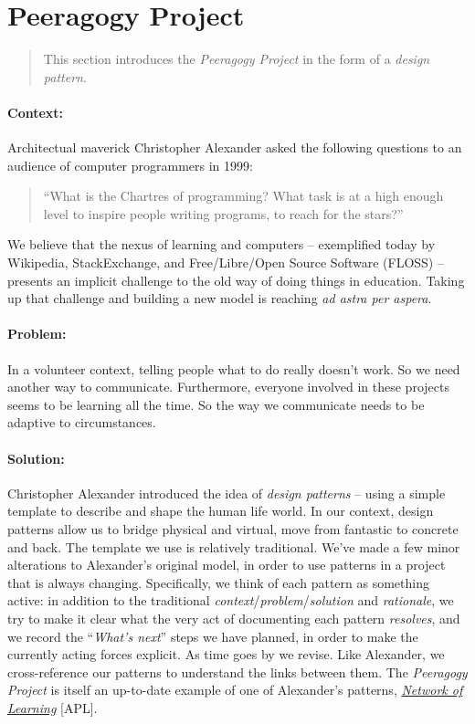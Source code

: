 \section{Peeragogy Project}

\begin{quote}
This section introduces the \emph{Peeragogy Project} in the form of a \emph{design pattern}.
\end{quote}

\paragraph{Context:}  Architectual maverick Christopher Alexander asked the following questions to an audience of computer programmers in 1999: 
\begin{quote}
``What is the Chartres of programming? What task is at a high enough level to inspire people writing programs, to reach for the stars?''
\end{quote}
We believe that the nexus of learning and computers -- exemplified today by Wikipedia, StackExchange, and Free/Libre/Open Source Software (FLOSS) -- presents an implicit challenge to the old way of doing things in education.  Taking up that challenge and building a new model is reaching \emph{ad astra per aspera}.  

\paragraph{Problem:} In a volunteer context, telling people what to do really doesn't work.  So we need another way to communicate.  Furthermore, everyone involved in these projects seems to be learning all the time.  So the way we communicate needs to be adaptive to circumstances.

\paragraph{Solution:} Christopher Alexander introduced the idea of \emph{design patterns} -- using a simple template to describe and shape the human life world.  In our context, design patterns allow us to bridge physical and virtual, move from fantastic to concrete and back.  The template we use is relatively traditional.  We've made a few minor alterations to Alexander's original model, in order to use patterns in a project that is always changing.  Specifically, we think of each pattern as something active: in addition to the traditional \emph{context}/\emph{problem}/\emph{solution} and \emph{rationale}, we try to make it clear what the very act of documenting each pattern \emph{resolves}, and we record the ``\emph{What's next}'' steps we have planned, in order to make the currently acting forces explicit. As time goes by we revise.  Like Alexander, we cross-reference our patterns to understand the links between them. The \emph{Peeragogy Project} is itself an up-to-date example of one of Alexander's patterns, \href{http://en.wikipedia.org/wiki/Networked_learning#1970s}{\emph{Network of Learning}} [APL].

